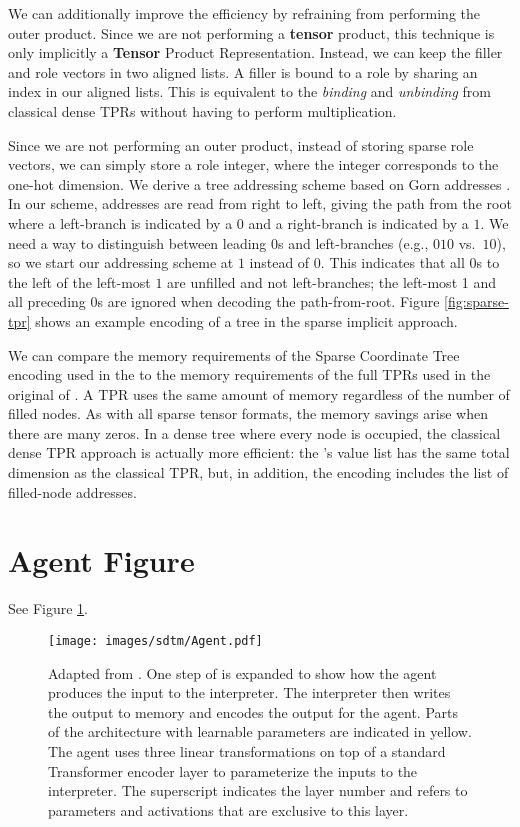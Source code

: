 We can additionally improve the efficiency by refraining from performing the outer product. Since we are not performing a \textbf{tensor} product, this technique is only implicitly a \textbf{Tensor} Product Representation. Instead, we can keep the filler and role vectors in two aligned lists. A filler is bound to a role by sharing an index in our aligned lists. This is equivalent to the \textit{binding} and \textit{unbinding} from classical dense TPRs without having to perform multiplication.

Since we are not performing an outer product, instead of storing sparse role vectors, we can simply store a role integer, where the integer corresponds to the one-hot dimension. We derive a tree addressing scheme based on Gorn addresses \citep{gorn+1967+77+115}. In our scheme, addresses are read from right to left, giving the path from the root where a left-branch is indicated by a $0$ and a right-branch is indicated by a $1$. We need a way to distinguish between leading $0$s and left-branches (e.g., $010$ vs.\ $10$), so we start our addressing scheme at $1$ instead of $0$. This indicates that all $0$s to the left of the left-most $1$ are unfilled and not left-branches; the left-most 1 and all preceding 0s are ignored when decoding the path-from-root. Figure \ref{fig:sparse-tpr} shows an example encoding of a tree in the sparse implicit approach.

We can compare the memory requirements of the Sparse Coordinate Tree encoding used in the \sdtm to the memory requirements of the full TPRs used in the original \dtm of \citet{Soulos_2023_DifferentiableTreeOperations}. A TPR uses the same amount of memory regardless of the number of filled nodes. As with all sparse tensor formats, the memory savings arise when there are many zeros. In a dense tree where every node is occupied, the classical dense TPR approach is actually more efficient: the \abvrepname's value list has the same total dimension as the classical TPR, but, in addition, the \abvrepname encoding includes the list of filled-node addresses.

\section{Agent Figure}
See Figure \ref{fig:agent}.
\begin{figure}
    \centering
    \texttt{[image: images/sdtm/Agent.pdf]}
    \caption{Adapted from \citet{Soulos_2023_DifferentiableTreeOperations}. One step of \dtm is expanded to show how the agent produces the input to the interpreter. The interpreter then writes the output to memory and encodes the output for the agent. Parts of the architecture with learnable parameters are indicated in yellow. The agent uses three linear transformations on top of a standard Transformer encoder layer to parameterize the inputs to the interpreter. The superscript indicates the layer number and refers to parameters and activations that are exclusive to this layer.}
    \label{fig:agent}
\end{figure}

